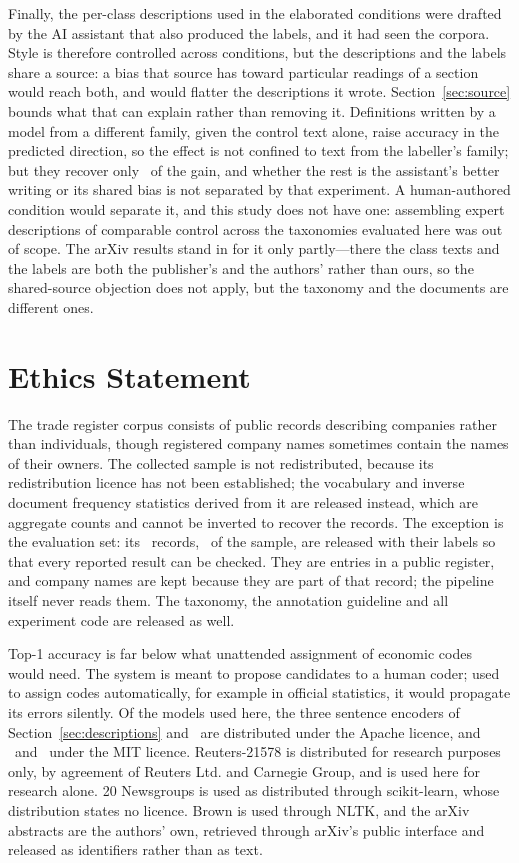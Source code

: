 \documentclass[11pt]{article}
\begin{document}
Finally, the per-class descriptions used in the elaborated conditions were
drafted by the AI assistant that also produced the labels, and it had seen the
corpora. Style is therefore controlled across conditions, but the descriptions
and the labels share a source: a bias that source has toward particular
readings of a section would reach both, and would flatter the descriptions it
wrote. Section~\ref{sec:source} bounds what that can explain rather than
removing it. Definitions written by a model from a different family, given the
control text alone, raise accuracy in the predicted direction, so the effect is
not confined to text from the labeller's family; but they recover only
\SourceWriterShare\ of the gain, and whether the rest is the assistant's
better writing or its shared bias is not separated by that experiment. A
human-authored condition would separate it, and this study does not have one:
assembling expert descriptions of comparable control across the taxonomies
evaluated here was out of scope. The arXiv results stand in for it only
partly---there the class texts and the labels are both the publisher's and the
authors' rather than ours, so the shared-source objection does not apply, but
the taxonomy and the documents are different ones.

\section*{Ethics Statement}

The trade register corpus consists of public records describing companies rather
than individuals, though registered company names sometimes contain the names of
their owners. The collected sample is not redistributed, because its
redistribution licence has not been established; the vocabulary and inverse
document frequency statistics derived from it are released instead, which are
aggregate counts and cannot be inverted to recover the records. The exception
is the evaluation set: its \NEVAL\ records, \EvalShareOfCorpus\ of the sample, are
released with their labels so that every reported result can be checked. They
are entries in a public register, and company names are kept because they are
part of that record; the pipeline itself never reads them. The taxonomy, the
annotation guideline and all experiment code are released as well.

Top-1 accuracy is far below what unattended assignment of economic codes would
need. The system is meant to propose candidates to a human coder; used to
assign codes automatically, for example in official statistics, it would
propagate its errors silently. Of the models used here, the three sentence
encoders of Section~\ref{sec:descriptions} and \LLMModel\ are distributed
under the Apache licence, and \BgeModel\ and \LLMTwoModel\ under the MIT
licence. Reuters-21578 is distributed for research
purposes only, by agreement of Reuters Ltd. and Carnegie Group, and is used
here for research alone. 20 Newsgroups is used as distributed through
scikit-learn, whose distribution states no licence. Brown is used through NLTK,
and the arXiv abstracts are the authors' own, retrieved through arXiv's public
interface and released as identifiers rather than as text.
\end{document}
